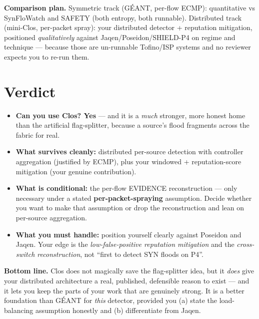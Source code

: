 \documentclass[11pt]{article}
\begin{document}
\noindent\textbf{Comparison plan.} Symmetric track (GÉANT, per-flow ECMP): quantitative vs SynFloWatch and
SAFETY (both entropy, both runnable). Distributed track (mini-Clos, per-packet spray): your distributed
detector + reputation mitigation, positioned \emph{qualitatively} against Jaqen/Poseidon/SHIELD-P4 on
regime and technique --- because those are un-runnable Tofino/ISP systems and no reviewer expects you to
re-run them.

\section{Verdict}
\begin{itemize}[leftmargin=1.4em]
  \item \textbf{Can you use Clos? Yes} --- and it is a \emph{much} stronger, more honest home than the
  artificial flag-splitter, because a source's flood fragments across the fabric for real.
  \item \textbf{What survives cleanly:} distributed per-source detection with controller aggregation
  (justified by ECMP), plus your windowed + reputation-score mitigation (your genuine contribution).
  \item \textbf{What is conditional:} the per-flow EVIDENCE reconstruction --- only necessary under a
  stated \textbf{per-packet-spraying} assumption. Decide whether you want to make that assumption or drop
  the reconstruction and lean on per-source aggregation.
  \item \textbf{What you must handle:} position yourself clearly against Poseidon and Jaqen. Your edge is
  the \emph{low-false-positive reputation mitigation} and the \emph{cross-switch reconstruction}, not
  ``first to detect SYN floods on P4''.
\end{itemize}

\noindent\textbf{Bottom line.} Clos does not magically save the flag-splitter idea, but it \emph{does} give
your distributed architecture a real, published, defensible reason to exist --- and it lets you keep the
parts of your work that are genuinely strong. It is a better foundation than GÉANT for \emph{this}
detector, provided you (a) state the load-balancing assumption honestly and (b) differentiate from Jaqen.
\end{document}
